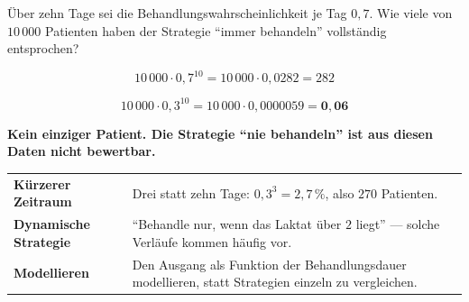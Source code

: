 \begin{aufgabe}
Über zehn Tage sei die Behandlungswahrscheinlichkeit je Tag $0{,}7$. Wie viele von $10\,000$ Patienten haben der Strategie \enquote{immer behandeln} vollständig entsprochen?

\loesung
{}
\[ 10\,000\cdot0{,}7^{10} = 10\,000\cdot0{,}0282 = 282 \]

\[ 10\,000\cdot0{,}3^{10} = 10\,000\cdot0{,}0000059 = \mathbf{0{,}06} \]

\begin{center}
\begin{minipage}{0.9\textwidth}
\textbf{Kein einziger Patient. Die Strategie \enquote{nie behandeln} ist aus diesen Daten nicht bewertbar.}
\end{minipage}
\end{center}

\begin{center}
{\small
\renewcommand{\arraystretch}{1.5}
\begin{tabular}{@{}P{2.8cm}P{5.8cm}@{}}
\toprule
\textbf{Kürzerer Zeitraum} & Drei statt zehn Tage: $0{,}3^{3} = 2{,}7\,\%$, also $270$ Patienten.\\
\textbf{Dynamische Strategie} & \enquote{Behandle nur, wenn das Laktat über $2$ liegt} --- solche Verläufe kommen häufig vor.\\
\textbf{Modellieren} & Den Ausgang als Funktion der Behandlungsdauer modellieren, statt Strategien einzeln zu vergleichen.\\
\bottomrule
\end{tabular}}
\end{center}

\begin{center}
\begin{minipage}{0.88\textwidth}
\end{minipage}
\end{center}
\end{aufgabe}

